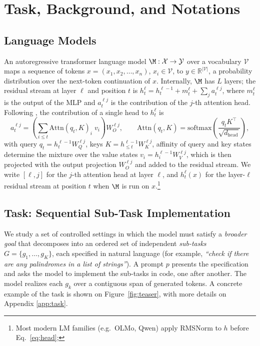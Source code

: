 \section{Task, Background, and Notations}
\label{sec:notations}

\subsection{Language Models}
\label{sec:notations:lm}

An autoregressive transformer language model $\M : \mathcal{X} \to \mathcal{Y}$ over a vocabulary $\mathcal{V}$ maps a sequence of tokens $x = (x_1, x_2, \dots, x_n)$, $x_i \in \mathcal{V}$, to $y \in \mathbb{R}^{|\mathcal{V}|}$, a probability distribution over the next-token continuation of $x$. Internally, $\M$ has $L$ layers; the residual stream at layer $\ell$ and position $t$ is
    $h_t^{\ell} = h_t^{\ell-1} + m_t^{\ell} + \sum_{j} a_t^{\ell j}$,
where $m_t^{\ell}$ is the output of the MLP and $a_t^{\ell j}$ is the contribution of the $j$-th attention head. Following \citet{elhage2021mathematical}, the contribution of a single head to $h_t^{\ell}$ is
\begin{equation}
    a_t^{\ell j} = \left( \sum_{i \le t} \mathrm{Attn}(q_t, K)_i \; v_i \right) W_{O}^{\ell j},
    \qquad
    \mathrm{Attn}(q_t, K) = \mathrm{softmax}\!\left(\frac{q_t K^\top}{\sqrt{d_{\text{head}}}}\right),
    \label{eq:head}
\end{equation}
with query $q_t = h_t^{\ell-1} W_Q^{\ell j}$, keys $K = h_{\le t}^{\ell-1} W_K^{\ell j}$, affinity of query and key states determine the mixture over the value states $v_i = h_i^{\ell-1} W_V^{\ell j}$, which is then projected with the output projection $W_{O}^{\ell j}$ and added to the residual stream. We write $[\ell, j]$ for the $j$-th attention head at layer $\ell$, and $h_t^{\ell}(x)$ for the layer-$\ell$ residual stream at position $t$ when $\M$ is run on $x$.\footnote{Most modern LM families (e.g.\ OLMo, Qwen) apply RMSNorm to $h$ before Eq.~\ref{eq:head}; }

\subsection{Task: Sequential Sub-Task Implementation}
\label{sec:notations:task}

We study a set of controlled settings in which the model must satisfy a \emph{broader goal} that decomposes into an ordered set of independent \emph{sub-tasks} $G = \{g_1, \dots, g_K\}$, each specified in natural language (for example, \textit{``check if there are any palindromes in a list of strings''}). A prompt $p$ presents the specification and asks the model to implement the sub-tasks in code, one after another. The model realizes each $g_k$ over a contiguous span of generated tokens. A concrete example of the task is shown on {\color{red} Figure~\ref{fig:teaser}}, with more details on Appendix \ref{app:task}.


